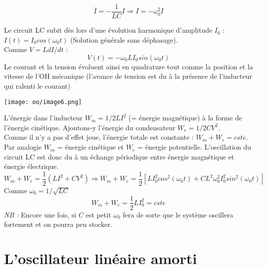\documentclass[british,french,11pt, a4paper, openany]{book}
\begin{document}
	\begin{equation}
		\ddot{I} = -\frac{1}{LC}I \Rightarrow \ddot{I} = -\omega_0^2I
	\end{equation}
	
	Le circuit LC subit dès lors d'une évolution harmonique d'amplitude $I_0$ : $I(t) = I_0 cos(\omega_0 t)$ (Solution générale sans déphasage).\\
	Comme $V = LdI/dt$ :
	\begin{equation}
		V(t) = -\omega_0LI_0sin(\omega_0 t)
	\end{equation}
	Le courant et la tension évoluent ainsi en quadrature tout comme la position et la vitesse de l'OH mécanique (l'avance de tension est du à la présence de l'inducteur qui ralenti le courant)
	\begin{center}
		\texttt{[image: oo/image6.png]}
	\end{center}
	L'énergie dans l'inducteur $W_m = 1/2LI^2$ (= énergie magnétique) à la forme de l'énergie cinétique. Ajoutons-y l'énergie du condensateur $W_e = 1/2CV^2$.\\
	Comme il n'y a pas d'effet joue, l'énergie totale est constante : $W_m + W_e = cste$.\\
	
	Par analogie $W_m$ = énergie cinétique et $W_e$ = énergie potentielle. L'oscillation du circuit LC est donc du à un échange périodique entre énergie magnétique et énergie électrique.
	\begin{equation}
		W_m + W_e = \frac{1}{2}(LI^2 + CV^2) \Rightarrow W_m + W_e = \frac{1}{2}\left[LI_0^2cos^2(\omega_0 t) + CL^2\omega_0^2I^2_0sin^2(\omega_0 t)\right]
	\end{equation}
	Comme $\omega_0 = 1/\sqrt{LC}$
	\begin{equation}
		W_m + W_e = \frac{1}{2}LI^2_0 = cste
	\end{equation}
	\textit{NB :} Encore une fois, si $C$ est petit $\omega_0$ fera de sorte que le système oscillera fortement et on pourra peu stocker.
	
	\section{L'oscillateur linéaire amorti}
\end{document}
